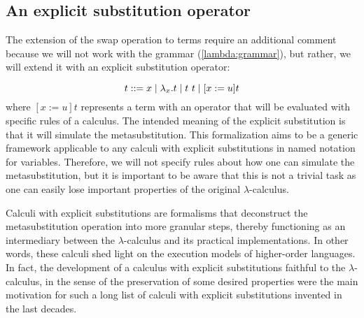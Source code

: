 \subsection{An explicit substitution operator}



 The extension of the swap operation to terms require an additional comment because we will not work with the grammar (\ref{lambda:grammar}), but rather, we will extend it with an explicit substitution operator:


\begin{equation}\label{es:grammar}
  t ::= x \mid \lambda_x.t \mid t\ t \mid \esub{t}{x}{u}
\end{equation}
\noindent where $[x := u] t$ represents a term with an operator that will be evaluated with specific rules of a calculus. The intended meaning of the explicit substitution is that it will simulate the metasubstitution. This formalization aims to be a generic framework applicable to any calculi with explicit substitutions in named notation for variables. Therefore, we will not specify rules about how one can simulate the metasubstitution, but it is important to be aware that this is not a trivial task as one can easily lose important properties of the original $\lambda$-calculus\cite{melliesTypedLcalculiExplicit1995,guillaumeLambdaCalculusDoes2000}.


Calculi with explicit substitutions are formalisms that deconstruct the metasubstitution operation into more granular steps, thereby functioning as an intermediary between the $\lambda$-calculus and its practical implementations. In other words, these calculi shed light on the execution models of higher-order languages. In fact, the development of a calculus with explicit substitutions faithful to the $\lambda$-calculus, in the sense of the preservation of some desired properties were the main motivation for such a long list of calculi with explicit substitutions invented in the last decades\cite{abadiExplicitSubstitutions1991,blooPreservationStrongNormalisation1995,benaissaLambdaUpsilonCalculus1996,curienConfluencePropertiesWeak1996,munozConfluencePreservationStrong1996,kamareddineExtendingLambdaCalculusExplicit1997,blooExplicitSubstitutionEdge1999,davidLambdacalculusExplicitWeakening2001,kesnerTheoryExplicitSubstitutions2009}.


